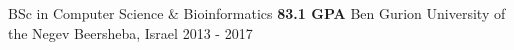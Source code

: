 \begin{cventries}

  \cventry
    {BSc in Computer Science \& Bioinformatics {\enskip\textbar\enskip} \textbf{83.1 GPA}} %
    {Ben Gurion University of the Negev} %
    {Beersheba, Israel} %
    {2013 - 2017} %
    {}

\end{cventries}
\vspace{-4.0mm}

